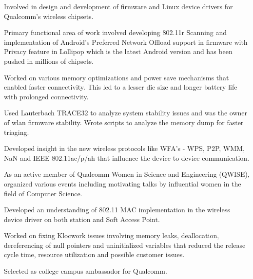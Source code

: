 \documentclass[letterpaper]{deedy-resume} %
\begin{document}
\begin{minipage}[t]{0.76\textwidth}
\sectionspace %

\vspace{-1 mm} %
\begin{tightitemize}
\item Involved in design and development of firmware and Linux device drivers for Qualcomm's wireless chipsets.
\item Primary functional area of work involved developing 802.11r Scanning and implementation of Android’s Preferred Network Offload support in firmware with Privacy feature in Lollipop which is the latest Android version and has been pushed in millions of chipsets.
\item Worked on various memory optimizations and power save mechanisms that enabled faster connectivity. This led to a lesser die size and longer battery life with prolonged connectivity.
\item Used Lauterbach TRACE32 to analyze system stability issues and was the owner of wlan firmware stability. Wrote scripts to analyze the memory dump for faster triaging.
\item Developed insight in the new wireless protocols like WFA's - WPS, P2P, WMM, NaN and IEEE 802.11ac/p/ah that influence the device to device communication.
\item As an active member of Qualcomm Women in Science and Engineering (QWISE), organized various events including motivating talks by influential women in the field of Computer Science.
\end{tightitemize}



\sectionspace %

\begin{tightitemize}
\item Developed an understanding of 802.11 MAC implementation in the wireless device driver on both station and Soft Access Point. 
\item Worked on fixing Klocwork issues involving memory leaks, deallocation, dereferencing of null pointers and uninitialized variables that reduced the release cycle time, resource utilization and possible customer issues.
\item Selected as college campus ambassador for Qualcomm.
\end{tightitemize}

\vspace{-1 mm} %

\end{minipage} %
\end{document}
